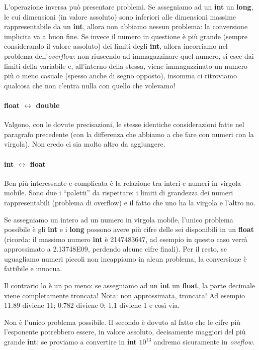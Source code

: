 	L'operazione inversa può presentare problemi. Se assegniamo ad un \textbf{int} un \textbf{long}, le cui dimensioni (in valore assoluto) sono inferiori alle dimensioni massime  rappresentabile da un \textbf{int}, allora non abbiamo nessun problema: la conversione implicita va a buon fine. Se invece il numero in questione è più grande (sempre considerando il valore assoluto) dei limiti degli \textbf{int}, allora incorriamo nel problema dell'\emph{overflow}: non riuscendo ad immagazzinare quel numero, si esce dai limiti della variabile e, all'interno della stessa, viene immagazzinato un numero più o meno casuale (spesso anche di segno opposto), insomma ci ritroviamo qualcosa che non c'entra nulla con quello che volevamo!
	\paragraph{float $\leftrightarrow$ double} Valgono, con le dovute precisazioni, le stesse identiche considerazioni fatte nel paragrafo precedente (con la differenza che abbiamo a che fare con numeri con la virgola). Non credo ci sia molto altro da aggiungere.
	\paragraph{int $\leftrightarrow$ float}
	Ben più interessante e complicata è la relazione tra interi e numeri in virgola mobile. 
	Sono due i ``paletti'' da rispettare: i limiti di grandezza dei numeri rappresentabili (problema di overflow) e il fatto che uno ha la virgola e l'altro no.
	
	Se assegniamo un intero ad un numero in virgola mobile, l'unico problema possibile è gli \textbf{int} e i \textbf{long} possono avere più cifre delle sei disponibili in un \textbf{float} (ricorda: il massimo numero \textbf{int} è 2147483647, ad esempio in questo caso verrà approssimato a 2.13748E09, perdendo alcune cifre finali). Per il resto, se uguagliamo numeri piccoli non incappiamo in alcun problema, la conversione è fattibile e innocua. 
	
	Il contrario lo è un po meno: se assegniamo ad un \textbf{int} un \textbf{float}, la parte decimale viene completamente troncata! Nota: non approssimata, troncata! Ad esempio 11.89 diviene 11; 0.782 diviene 0; 1.1 diviene 1 e così via. 
	
	Non è l'unico problema possibile. Il secondo è dovuto al fatto che le cifre più l'esponente potrebbero essere, in valore assoluto, decisamente maggiori del più grande \textbf{int}: se proviamo a convertire in \textbf{int} $10^{13}$ andremo sicuramente in \emph{oveflow}.
	\\
	
